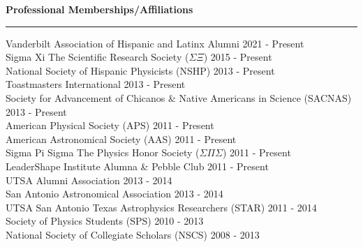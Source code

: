 \documentclass[letter,11pt]{article}
\begin{document}

 
\noindent
{\bf Professional Memberships/Affiliations} \\
\vspace{-10mm}
\begin{center}
\rule{\textwidth}{0.2mm}
\end{center}
\vspace{-3mm}
\noindent
Vanderbilt Association of Hispanic and Latinx Alumni \hfill 2021 - Present \\
Sigma Xi \text{\textbar} The Scientific Research Society ($\Sigma \Xi$) \hfill 2015 - Present \\
National Society of Hispanic Physicists (NSHP) \hfill 2013 - Present \\
Toastmasters International \hfill 2013 - Present \\
Society for Advancement of Chicanos \& Native Americans in Science (SACNAS) \hfill 2013 - Present  \\
American Physical Society (APS) \hfill 2011 - Present \\
American Astronomical Society (AAS) \hfill 2011 - Present \\
Sigma Pi Sigma \text{\textbar} The Physics Honor Society ($\Sigma \Pi \Sigma$) \hfill 2011 - Present \\
LeaderShape Institute Alumna \& Pebble Club \hfill 2011 - Present \\
UTSA Alumni Association \hfill 2013 - 2014 \\
San Antonio Astronomical Association \hfill 2013 - 2014 \\
UTSA San Antonio Texas Astrophysics Researchers (STAR) \hfill 2011 - 2014 \\
Society of Physics Students (SPS) \hfill 2010 - 2013 \\
National Society of Collegiate Scholars (NSCS) \hfill 2008 - 2013 \\



\end{document}
